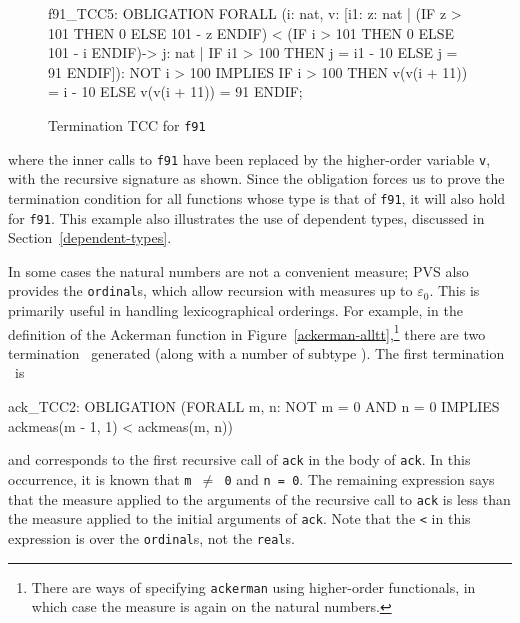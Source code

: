 \begin{figure}[ht]
\begin{session}
f91_TCC5: OBLIGATION
  FORALL (i: nat,
          v: [i1:
               \setb{}z: nat |
                        (IF z > 101 THEN 0 ELSE 101 - z ENDIF) <
                         (IF i > 101 THEN 0 ELSE 101 - i ENDIF)\sete ->
               \setb{}j: nat | IF i1 > 100 THEN j = i1 - 10 ELSE j = 91 ENDIF\sete]):
    NOT i > 100 IMPLIES
     IF i > 100 THEN v(v(i + 11)) = i - 10 ELSE v(v(i + 11)) = 91 ENDIF;
\end{session}
\caption{Termination TCC for \texttt{f91}}\label{f91-tcc}
\end{figure}
where the inner calls to \texttt{f91} have been replaced by the
higher-order variable \texttt{v}, with the recursive signature as shown.
Since the obligation forces us to prove the termination condition for all
functions whose type is that of \texttt{f91}, it will also hold for
\texttt{f91}.  This example also illustrates the use of dependent types,
discussed in Section~\ref{dependent-types}.


\renewcommand{\textfraction}{.01}

In some cases the natural numbers are not a convenient measure; PVS
also provides the \texttt{ordinal}s, which allow recursion with measures up
to $\varepsilon_0$.  This is primarily useful in handling
lexicographical orderings.  For example, in the definition of the
Ackerman function in Figure~\ref{ackerman-alltt},\footnote{There are
ways of specifying \texttt{ackerman} using higher-order functionals, in
which case the measure is again on the natural numbers.} there are two
termination \tccs\ generated (along with a number of subtype \tccs).
The first termination \tcc\ is
\begin{pvsex}
  ack_TCC2:
    OBLIGATION
      (FORALL m, n:
        NOT m = 0 AND n = 0 IMPLIES ackmeas(m - 1, 1) < ackmeas(m, n))
\end{pvsex}
%
and corresponds to the first recursive call of \texttt{ack} in the body of
\texttt{ack}.  In this occurrence, it is known that \texttt{m $\neq$ 0}
and \texttt{n = 0}.  The remaining expression says that the measure
applied to the arguments of the recursive call to \texttt{ack} is less
than the measure applied to the initial arguments of \texttt{ack}.  Note
that the \texttt{<} in this expression is over the \texttt{ordinal}s, not
the \texttt{real}s.

